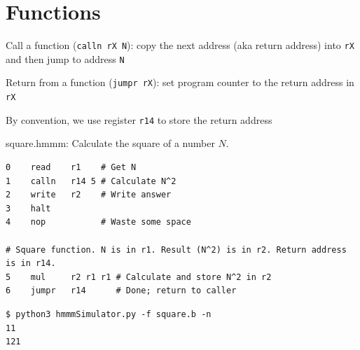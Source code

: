 \documentclass[8pt,a4paper,compress]{beamer}
\begin{document}
\section{Functions}

\begin{frame}[fragile]
\pause

Call a function (\lstinline{calln rX N}): copy the next address (aka return address) into \lstinline$rX$ and then jump to address \lstinline{N}

\pause
\bigskip

Return from a function (\lstinline{jumpr rX}): set program counter to the return address in \lstinline{rX}

\pause
\bigskip

By convention, we use register \lstinline{r14} to store the return address

\pause

\begin{framed}
\tiny square.hmmm: Calculate the square of a number $N$.
\end{framed}

\begin{lstlisting}[language={}]
0    read    r1    # Get N
1    calln   r14 5 # Calculate N^2 
2    write   r2    # Write answer
3    halt
4    nop           # Waste some space

# Square function. N is in r1. Result (N^2) is in r2. Return address is in r14.
5    mul     r2 r1 r1 # Calculate and store N^2 in r2
6    jumpr   r14      # Done; return to caller
\end{lstlisting}

\pause

\begin{lstlisting}[language={}]
$ python3 hmmmSimulator.py -f square.b -n
11
121
\end{lstlisting}
\end{frame}
\end{document}

